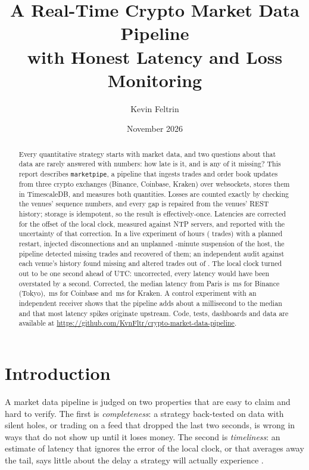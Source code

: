 \documentclass[11pt,a4paper]{article}
\title{\textbf{A Real-Time Crypto Market Data Pipeline}\\[4pt]
  \large with Honest Latency and Loss Monitoring}
\author{Kevin Feltrin}
\date{November 2026}
\newcommand{\code}[1]{\texttt{#1}}
\newcommand{\repo}{\url{https://github.com/KvnFltr/crypto-market-data-pipeline}}
\newcommand{\ms}{\,ms}
\begin{document}
\maketitle

\begin{abstract}
\noindent
Every quantitative strategy starts with market data, and two questions about that data are rarely answered
with numbers: how late is it, and is any of it missing? This report describes \code{marketpipe}, a pipeline
that ingests trades and order book updates from three crypto exchanges (Binance, Coinbase, Kraken) over
websockets, stores them in TimescaleDB, and measures both quantities. Losses are counted exactly by checking
the venues' sequence numbers, and every gap is repaired from the venues' REST history; storage is idempotent,
so the result is effectively-once. Latencies are corrected for the offset of the local clock, measured against
NTP servers, and reported with the uncertainty of that correction. In a live experiment of \TotalHours{} hours
(\TradesRows{} trades) with a planned restart, \ChaosDisconnects{} injected disconnections and an unplanned
\SuspensionMinutes-minute suspension of the host, the pipeline detected \TotalMissing{} missing trades and
recovered \RecoveredPctText{} of them; an independent audit against each venue's history found \AuditMissing{}
missing and \AuditMismatched{} altered trades out of \AuditReference. The local clock turned out to be one second
ahead of UTC: uncorrected, every latency would have been overstated by a second. Corrected, the median latency
from Paris is \LatBinancePfifty\ms{} for Binance (Tokyo), \LatCoinbasePfifty\ms{} for Coinbase and
\LatKrakenPfifty\ms{} for Kraken. A control experiment with an independent receiver shows that the pipeline adds
about a millisecond to the median and that most latency spikes originate upstream. Code, tests, dashboards and
data are available at \repo.
\end{abstract}

\tableofcontents
\bigskip

\section{Introduction}

A market data pipeline is judged on two properties that are easy to claim and hard to verify. The first is
\emph{completeness}: a strategy back-tested on data with silent holes, or trading on a feed that dropped the
last two seconds, is wrong in ways that do not show up until it loses money. The second is \emph{timeliness}:
an estimate of latency that ignores the error of the local clock, or that averages away the tail, says little
about the delay a strategy will actually experience \citep{tene2015}.
\end{document}
